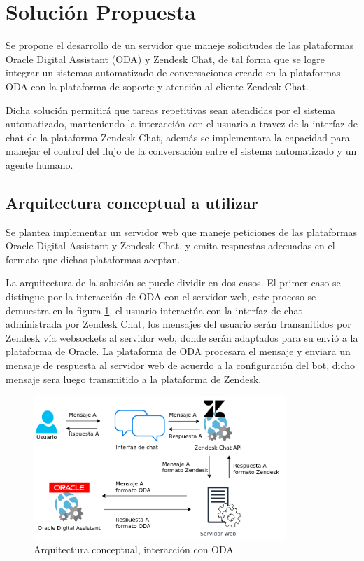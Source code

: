     
    
\section{Solución Propuesta}

Se propone el desarrollo de un servidor que maneje solicitudes de las plataformas Oracle Digital Assistant (ODA) y Zendesk Chat, de tal forma que se logre integrar un sistemas automatizado de conversaciones creado en la plataformas ODA con la plataforma de soporte y atención al cliente Zendesk Chat.

Dicha solución permitirá que tareas repetitivas sean atendidas por el sistema automatizado, manteniendo la interacción con el usuario a travez de la interfaz de chat de la plataforma Zendesk Chat, además se implementara la capacidad para manejar el control del flujo de la conversación entre el sistema automatizado y un agente humano.

    \subsection{Arquitectura conceptual a utilizar}
    Se plantea implementar un servidor web que maneje peticiones de las  plataformas Oracle Digital Assistant y Zendesk Chat, y emita respuestas adecuadas en el formato que dichas plataformas aceptan.
    
    La arquitectura de la solución se puede dividir en dos casos. El primer caso  se distingue por la interacción de ODA con el servidor web, este proceso se demuestra en la figura \ref{fig:arqconoda}, el usuario interactúa con la interfaz de chat administrada por Zendesk Chat, los mensajes del usuario serán transmitidos por Zendesk vía websockets al servidor web, donde serán adaptados para su envió a la plataforma de Oracle. La plataforma de ODA procesara el mensaje y enviara un mensaje de respuesta al servidor web de acuerdo a la configuración del bot, dicho mensaje sera luego transmitido a la plataforma de Zendesk.
    \begin{figure}[htpb]
        \centering
        \includegraphics[width=0.85\textwidth]{Figuras/propuestasolucion1.png}
        \caption{Arquitectura conceptual, interacción con ODA}
        \label{fig:arqconoda}
    \end{figure}
    

